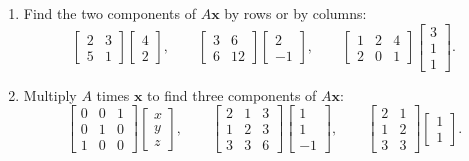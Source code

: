 \documentclass[14pt, a4paper]{article}
\begin{document}
\begin{enumerate}[resume]
    \item Find the two components of $A\boldsymbol{x}$ by rows or by columns:
          \[
              \begin{bmatrix} 2 & 3 \\ 5 & 1 \end{bmatrix}
              \begin{bmatrix} 4 \\ 2 \end{bmatrix},
              \qquad
              \begin{bmatrix} 3 & 6 \\ 6 & 12 \end{bmatrix}
              \begin{bmatrix} 2 \\ -1 \end{bmatrix},
              \qquad
              \begin{bmatrix} 1 & 2 & 4 \\ 2 & 0 & 1 \end{bmatrix}
              \begin{bmatrix} 3 \\ 1 \\ 1 \end{bmatrix}.
          \]

    \item Multiply $A$ times $\boldsymbol{x}$ to find three components of $A\boldsymbol{x}$:
          \[
              \begin{bmatrix}
                  0 & 0 & 1 \\
                  0 & 1 & 0 \\
                  1 & 0 & 0
              \end{bmatrix}
              \begin{bmatrix} x \\ y \\ z \end{bmatrix},
              \qquad
              \begin{bmatrix}
                  2 & 1 & 3 \\
                  1 & 2 & 3 \\
                  3 & 3 & 6
              \end{bmatrix}
              \begin{bmatrix} 1 \\ 1 \\ -1 \end{bmatrix},
              \qquad
              \begin{bmatrix}
                  2 & 1 \\
                  1 & 2 \\
                  3 & 3
              \end{bmatrix}
              \begin{bmatrix} 1 \\ 1 \end{bmatrix}.
          \]


\end{enumerate}
\end{document}
